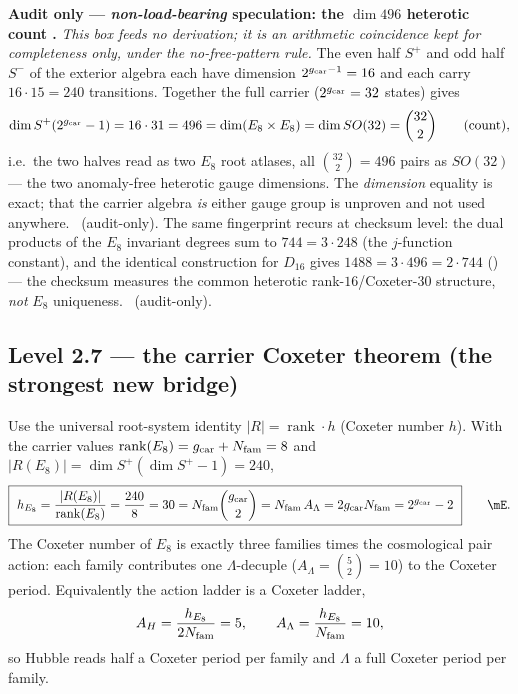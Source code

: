 \par\smallskip\noindent\textbf{Audit only --- \emph{non-load-bearing} speculation: the $\dim 496$ heterotic count \mO.}
\emph{This box feeds no derivation; it is an arithmetic coincidence kept for completeness only, under the
no-free-pattern rule.} The even half $S^+$ and odd half $S^-$ of the exterior algebra each have dimension
$2^{g_{\mathrm{car}}-1}=16$ and each carry $16\cdot15=240$ transitions. Together the full carrier ($2^{g_{\mathrm{car}}}=32$
states) gives
\[
  \dim S^+(2^{g_{\mathrm{car}}}-1)=16\cdot31=496=\dim(E_8\times E_8)=\dim SO(32)=\binom{32}{2}\qquad(\text{count}),
\]
i.e.\ the two halves read as two $E_8$ root atlases, all $\binom{32}{2}=496$ pairs as $SO(32)$ --- the two
anomaly-free heterotic gauge dimensions. The \emph{dimension} equality is exact; that the carrier algebra
\emph{is} either gauge group is unproven and not used anywhere. \mO\ (audit-only). The same fingerprint
recurs at checksum level: the dual products of the $E_8$ invariant degrees sum to $744=3\cdot248$ (the
$j$-function constant), and the identical construction for $D_{16}$ gives $1488=3\cdot496=2\cdot744$
() --- the checksum measures the common heterotic
rank-$16$/Coxeter-$30$ structure, \emph{not} $E_8$ uniqueness. \mE\ (audit-only).
\par\smallskip

\subsection{Level 2.7 --- the carrier Coxeter theorem (the strongest new bridge)}
Use the universal root-system identity $|R|=\operatorname{rank}\cdot h$ (Coxeter number $h$). With the
carrier values $\operatorname{rank}(E_8)=g_{\mathrm{car}}+N_{\mathrm{fam}}=8$ and $|R(E_8)|=\dim S^+(\dim S^+-1)=240$,
\begin{equation}
  \boxed{\ h_{E_8}=\frac{|R(E_8)|}{\operatorname{rank}(E_8)}=\frac{240}{8}=30
  =\Nfam\binom{\gcar}{2}=\Nfam\,A_\Lambda=2\gcar\Nfam=2^{\gcar}-2\ }\qquad\mE .
\end{equation}
The Coxeter number of $E_8$ is exactly three families times the cosmological pair action: each family
contributes one $\Lambda$-decuple ($A_\Lambda=\binom52=10$) to the Coxeter period. Equivalently the
action ladder is a Coxeter ladder,
\begin{equation}
  A_H=\frac{h_{E_8}}{2N_{\mathrm{fam}}}=5,\qquad A_\Lambda=\frac{h_{E_8}}{N_{\mathrm{fam}}}=10,
\end{equation}
so Hubble reads half a Coxeter period per family and $\Lambda$ a full Coxeter period per family. \mC

